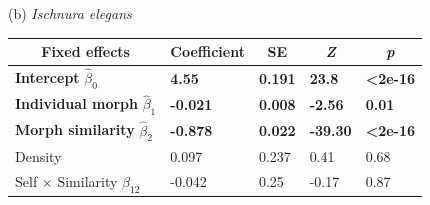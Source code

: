 \documentclass[12pt,]{article}
\begin{document}
\begin{table}[ht]
(b) \textit{Ischnura elegans} \\
\begin{tabular}{lllll}
\hline
\multicolumn{1}{c}{Fixed effects} & \multicolumn{1}{c}{Coefficient} & \multicolumn{1}{c}{SE} & \multicolumn{1}{c}{\textit{Z}} & \multicolumn{1}{c}{\textit{p}} \\ \hline
\textbf{Intercept} $\hat{\beta}_{0}$    & \textbf{4.55} &  \textbf{0.191} & \textbf{23.8}  & \textbf{\textless{}2e-16}  \\
\textbf{Individual morph} $\hat{\beta}_{1}$               & \textbf{-0.021}                 & \textbf{0.008}         & \textbf{-2.56}                 & \textbf{0.01}                  \\
\textbf{Morph similarity} $\hat{\beta}_{2}$           & \textbf{-0.878}                 & \textbf{0.022}         & \textbf{-39.30}                & \textbf{\textless{}2e-16}      \\
Density                             & 0.097                           & 0.237                  & 0.41                           & 0.68                           \\
Self $\times$ Similarity $\hat{\beta}_{12}$                 & -0.042                          & 0.25                 & -0.17                          & 0.87                           \\ \hline
\end{tabular}
\label{table1:GLMM}
\end{table}
\end{document}
